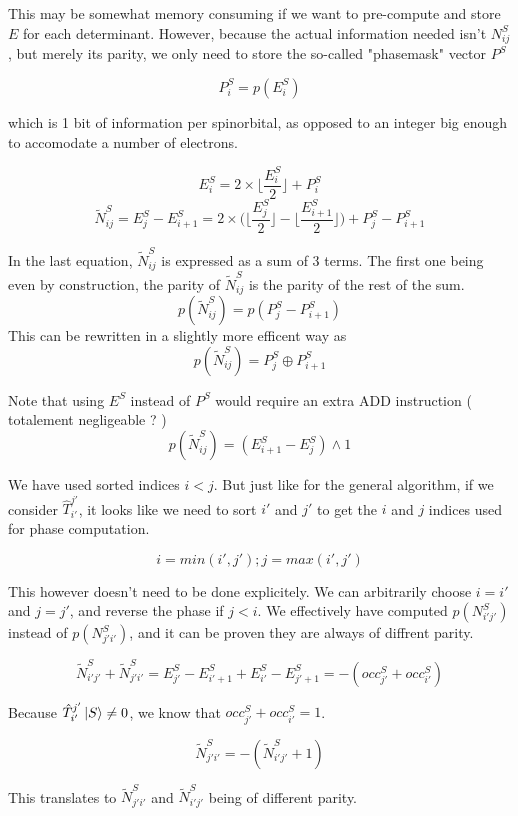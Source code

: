 This may be somewhat memory consuming if we want to pre-compute and store $E$ for each determinant. However, because the actual information needed isn't $N^S_{ij}$, but merely its parity, we only need to store the so-called "phasemask" vector $P^S$

$$P^S_i = p(E^S_i)$$

which is 1 bit of information per spinorbital, as opposed to an integer big enough to accomodate a number of electrons.
       
$$E^S_i = 2 \times  \lfloor \frac{E^S_i}2 \rfloor + P^S_i$$
$$\tilde N^S_{ij} = E^S_j - E^S_{i+1} = 2 \times \big ( \lfloor \frac{E^S_j}2 \rfloor - \lfloor \frac{E^S_{i+1}}2 \rfloor \big ) + P^S_j - P^S_{i+1}$$
	    
In the last equation, $\tilde N^S_{ij}$ is expressed as a sum of 3 terms. The first one being even by construction, the parity of $\tilde N^S_{ij}$ is the parity of the rest of the sum.
$$p(\tilde N^S_{ij})=p(P^S_j - P^S_{i+1})$$
This can be rewritten in a slightly more efficent way as
$$p(\tilde N^S_{ij}) = P^S_j \oplus P^S_{i+1}$$

Note that using $E^S$ instead of $P^S$ would require an extra ADD instruction ( totalement negligeable ? )
$$p(\tilde N^S_{ij}) = (E^S_{i+1} - E^S_j) \wedge 1$$

We have used sorted indices $i<j$. But just like for the general algorithm, if we consider $\hat T_{i'}^{j'}$, it looks like we need to sort $i'$ and $j'$ to get the $i$ and $j$ indices used for phase computation.

$$i=min(i', j') ; j=max(i', j')$$

This however doesn't need to be done explicitely. We can arbitrarily choose $i=i'$ and $j=j'$, and reverse the phase if $j<i$. We effectively have computed $p(N^S_{i'j'})$ instead of $p(N^S_{j'i'})$, and it can be proven they are always of diffrent parity.

$$\tilde N^{S}_{i' j'} + \tilde N^{S}_{j'i'} = E^{S}_{j'} - E^S_{i'+1} + E^S_{i'} - E^S_{j'+1} = -(occ^S_{j'} + occ^S_{i'})$$

Because $\hat T_{i'}^{j'} \ket S \neq 0$, we know that $occ^S_{j'} + occ^S_{i'} = 1$. 

$$\tilde N^{S}_{j' i'} = -(\tilde N^{S}_{i'j'} + 1)$$

This translates to $\tilde N^{S}_{j' i'}$ and $\tilde N^{S}_{i'j'}$ being of different parity.



